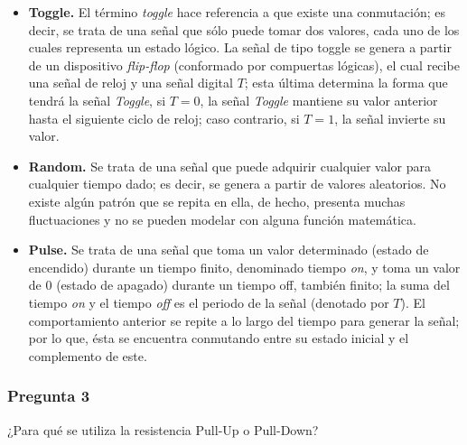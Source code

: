 \documentclass[../procedimientos.tex]{subfiles}
\begin{document}
\begin{itemize}
  \item \textbf{Toggle.} El término \textit{toggle} hace referencia a que 
  existe una conmutación; es decir, se trata de una señal que sólo puede tomar 
    dos valores, cada uno de los cuales representa un estado lógico. La señal 
    de tipo toggle se genera a partir de un dispositivo \textit{flip-flop} 
    (conformado por compuertas lógicas), el cual recibe una señal de reloj y 
    una señal digital $T$; esta última determina la forma que tendrá la señal 
    \textit{Toggle}, si $T=0$, la señal \textit{Toggle} mantiene su valor 
    anterior hasta el siguiente ciclo de reloj; caso contrario, si $T=1$, la 
    señal invierte su valor.
  \item \textbf{Random.} Se trata de una señal que puede adquirir cualquier 
    valor para cualquier tiempo dado; es decir, se genera a partir de valores 
    aleatorios. No existe algún patrón que se repita en ella, de hecho, 
    presenta muchas fluctuaciones y no se pueden modelar con alguna función 
    matemática.
  \item \textbf{Pulse.} Se trata de una señal que toma un valor determinado 
    (estado de encendido) durante un tiempo finito, denominado tiempo 
    \textit{on}, y toma un valor de $0$ (estado de apagado) durante un tiempo 
    off, también finito; la suma del tiempo \textit{on} y el tiempo 
    \textit{off} es el periodo de la señal (denotado por $T$). El 
    comportamiento anterior se repite a lo largo del tiempo para generar la 
    señal; por lo que, ésta se encuentra conmutando entre su estado inicial y 
    el complemento de este.
\end{itemize}

\subsubsection*{Pregunta 3}
\begin{em}
  ¿Para qué se utiliza la resistencia Pull-Up o Pull-Down?
\end{em}
\end{document}
